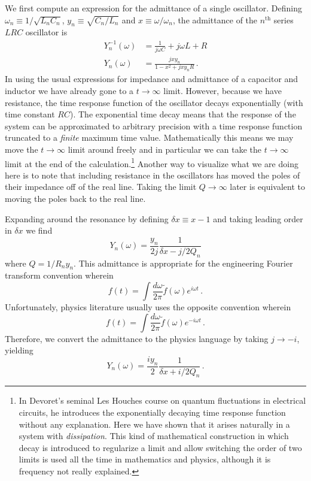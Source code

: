 
We first compute an expression for the admittance of a single oscillator.
Defining $\omega_n \equiv 1/\sqrt{L_n C_n}$, $y_n \equiv \sqrt{C_n / L_n}$ and $x \equiv \omega / \omega_n$, the admittance of the $n^{\text{th}}$ series $LRC$ oscillator is
\begin{align}
Y_n^{-1}(\omega) &= \frac{1}{j \omega C} + j \omega L + R \\
Y_n(\omega) &= \frac{j x y_n}{1 - x^2 + j x y_n R} \, .
\end{align}
In using the usual expressions for impedance and admittance of a capacitor and inductor we have already gone to a $t \rightarrow \infty$ limit.
However, because we have resistance, the time response function of the oscillator decays exponentially (with time constant $RC$).
The exponential time decay means that the response of the system can be approximated to arbitrary precision with a time response function truncated to a \emph{finite} maximum time value.
Mathematically this means we may move the $t \rightarrow \infty$ limit around freely and in particular we can take the $t \rightarrow \infty$ limit at the end of the calculation.\footnote{In Devoret's seminal Les Houches course on quantum fluctuations in electrical circuits, he introduces the exponentially decaying time response function without any explanation. Here we have shown that it arises naturally in a system with \emph{dissipation}. This kind of mathematical construction in which decay is introduced to regularize a limit and allow switching the order of two limits is used all the time in mathematics and physics, although it is frequency not really explained.}
Another way to visualize what we are doing here is to note that including resistance in the oscillators has moved the poles of their impedance off of the real line.
Taking the limit $Q \rightarrow \infty$ later is equivalent to moving the poles back to the real line.

Expanding around the resonance by defining $\delta x \equiv x - 1$ and taking leading order in $\delta x$ we find
\begin{equation}
Y_n(\omega) = \frac{y_n}{2j} \frac{1}{\delta x - j/2 Q_n}
\end{equation}
where $Q = 1 / R_n y_n$.
This admittance is appropriate for the engineering Fourier transform convention wherein
\begin{equation}
f(t) = \int \frac{d\omega}{2 \pi} \tilde{f}(\omega) e^{i \omega t} \, .
\end{equation}
Unfortunately, physics literature usually uses the opposite convention wherein
\begin{equation}
f(t) = \int \frac{d\omega}{2 \pi} \tilde{f}(\omega) e^{-i \omega t} \, .
\end{equation}
Therefore, we convert the admittance to the physics language by taking $j \rightarrow -i$, yielding
\begin{equation}
Y_n(\omega) = \frac{i y_n}{2} \frac{1}{\delta x + i/2 Q_n} \, . \label{eq:ch.decoherence.sec.caldeira-leggett:LC_admittance}
\end{equation}

